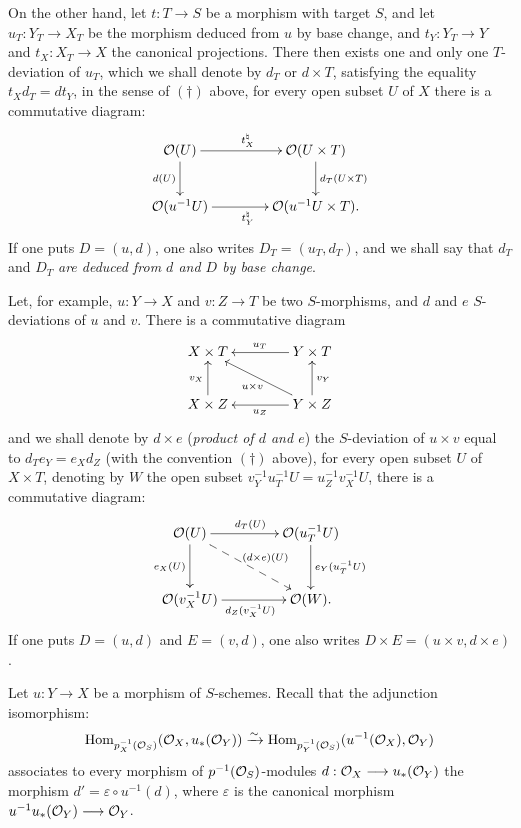 On the other hand, let $t:T\to S$ be a morphism with target $S$, and let $u_T:Y_T\to X_T$ be the morphism deduced from $u$ by base change, and $t_Y:Y_T\to Y$ and $t_X:X_T\to X$ the canonical projections. There then exists one and only one $T$-deviation of $u_T$, which we shall denote by $d_T$ or $d\times T$, satisfying the equality $t_Xd_T=dt_Y$, in the sense of $(\dagger)$ above, \ie for every open subset $U$ of $X$ there is a commutative diagram:
\[
\xymatrix@C=4em{\OO(U)\ar[r]^{t_X^\natural}\ar[d]_{d(U)}&\OO(U\times T)\ar[d]^{d_T(U\times T)}\\
\OO(u^{-1}U)\ar[r]_{t_Y^\natural}&\OO(u^{-1}U\times T).}
\]
If one puts $D=(u,d)$, one also writes $D_T=(u_T,d_T)$, and we shall say that $d_T$ and $D_T$ \emph{are deduced from $d$ and $D$ by base change}.

Let, for example, $u:Y\to X$ and $v:Z\to T$ be two $S$-morphisms, and $d$ and $e$ $S$-deviations of $u$ and $v$. There is a commutative diagram
\[
\xymatrix@C=4em{X\times T&Y\times T\ar[l]_{u_T}\\
X\times Z\ar[u]^{v_X}&Y\times Z\ar[l]^{u_Z}\ar[u]_{v_Y}\ar[ul]^{u\times v}}
\]
and we shall denote by $d\times e$ (\emph{product of $d$ and $e$}) the $S$-deviation of $u\times v$ equal to $d_Te_Y=e_Xd_Z$ (with the convention $(\dagger)$ above), \ie for every open subset $U$ of $X\times T$, denoting by $W$ the open subset $v_Y^{-1}u_T^{-1}U=u_Z^{-1}v_X^{-1}U$, there is a commutative diagram:
\[
\xymatrix@C=4em@R=3em{\OO(U)\ar[r]^{d_T(U)}\ar[d]_{e_X(U)}\ar@{-->}[dr]^{(d\times e)(U)}&\OO(u_T^{-1}U)\ar[d]^{e_Y(u_T^{-1}U)}\\
\OO(v_X^{-1}U)\ar[r]_{d_Z(v_X^{-1}U)}&\OO(W).}
\]
If one puts $D=(u,d)$ and $E=(v,d)$, one also writes $D\times E=(u\times v,d\times e)$.

Let $u:Y\to X$ be a morphism of $S$-schemes. Recall that the adjunction isomorphism:
\[
\operatorname{Hom}_{p_X^{-1}(\mathcal{O}_S)}(\mathcal{O}_X,u_*(\mathcal{O}_Y))\xrightarrow{\sim}\operatorname{Hom}_{p_Y^{-1}(\mathcal{O}_S)}(u^{-1}(\mathcal{O}_X),\mathcal{O}_Y)
\]
associates to every morphism of $p^{-1}(\mathcal{O}_S)$-modules $d:\mathcal{O}_X\longrightarrow u_*(\mathcal{O}_Y)$ the morphism $d'=\varepsilon\circ u^{-1}(d)$, where $\varepsilon$ is the canonical morphism $u^{-1}u_*(\mathcal{O}_Y)\longrightarrow\mathcal{O}_Y$.

